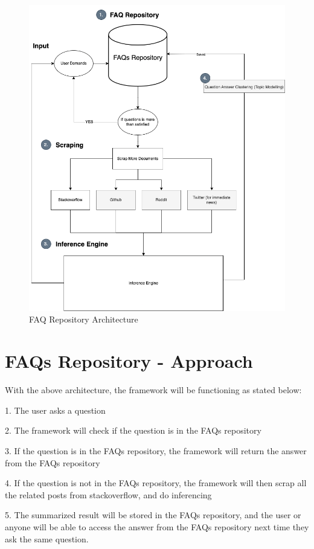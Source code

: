 \pagebreak
\begin{figure}[H]
  \centering
  \noindent \includegraphics[scale=0.58]{assets/faq_repo_workflow.png}
\caption{FAQ Repository Architecture}\label{faq_repo_architecture}
\end{figure}

\section{FAQs Repository - Approach}
With the above architecture, the framework will be functioning as stated below:

1. The user asks a question

2. The framework will check if the question is in the FAQs repository

3. If the question is in the FAQs repository, the framework will return the answer from the FAQs repository

4. If the question is not in the FAQs repository, the framework will then scrap all the related posts from stackoverflow, and do inferencing

5. The summarized result will be stored in the FAQs repository, and the user or anyone will be able to access the answer from the FAQs repository next time they ask the same question.

